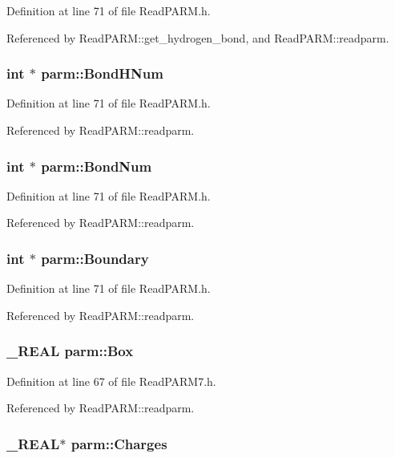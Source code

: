 Definition at line 71 of file Read\-PARM.h.

Referenced by Read\-PARM::get\_\-hydrogen\_\-bond, and Read\-PARM::readparm.
\subsubsection{\setlength{\rightskip}{0pt plus 5cm}int $\ast$ parm::Bond\-HNum}\label{structparm_m64}




Definition at line 71 of file Read\-PARM.h.

Referenced by Read\-PARM::readparm.
\subsubsection{\setlength{\rightskip}{0pt plus 5cm}int $\ast$ parm::Bond\-Num}\label{structparm_m67}




Definition at line 71 of file Read\-PARM.h.

Referenced by Read\-PARM::readparm.
\subsubsection{\setlength{\rightskip}{0pt plus 5cm}int $\ast$ parm::Boundary}\label{structparm_m86}




Definition at line 71 of file Read\-PARM.h.

Referenced by Read\-PARM::readparm.
\subsubsection{\setlength{\rightskip}{0pt plus 5cm}\_\-REAL parm::Box}\label{structparm_m50}




Definition at line 67 of file Read\-PARM7.h.

Referenced by Read\-PARM::readparm.
\subsubsection{\setlength{\rightskip}{0pt plus 5cm}\_\-REAL$\ast$ parm::Charges}\label{structparm_m36}




